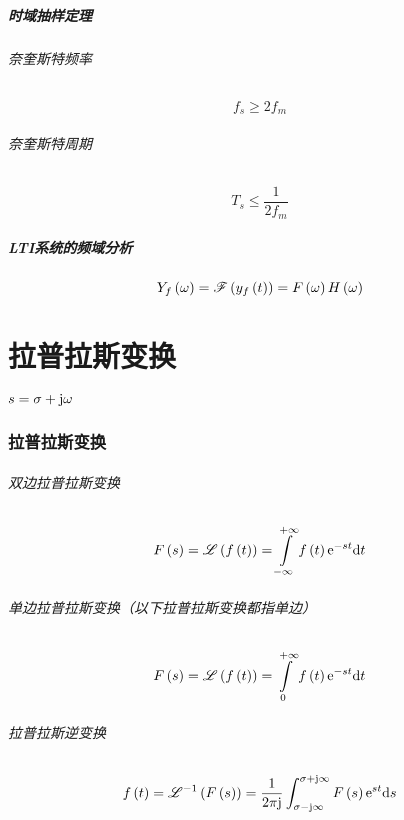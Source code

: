 \documentclass{article}
\begin{document}
\subsubsection{时域抽样定理}

\paragraph{奈奎斯特频率}

\[f_s\geqslant2f_m\]

\paragraph{奈奎斯特周期}

\[T_s\leqslant\frac1{2f_m}\]

\subsubsection{LTI系统的频域分析}

\[Y_f\left(\omega\right)=\mathscr F\left(y_f\left(t\right)\right)=F\left(\omega\right) H\left(\omega\right)\]

\part{拉普拉斯变换}

$s=\sigma+\mathrm j\omega$

\section{拉普拉斯变换}

\paragraph{双边拉普拉斯变换}

\[\fs=\laplace{\ft}=\impint\ft\e^{-st}\d t\]

\paragraph{单边拉普拉斯变换（以下拉普拉斯变换都指单边）}

\[F\left(s\right)=\mathscr L\left(f\left(t\right)\right)=\int\limits_0^{+\infty}f\left(t\right)\mathrm e^{-st}\mathrm d t\]

\paragraph{拉普拉斯逆变换}

\[f\left(t\right)=\mathscr L^{-1}\left(F\left(s\right)\right)=\frac1{2\pi\mathrm j}\int_{\sigma-\mathrm j\infty}^{\sigma+\mathrm j\infty}F\left(s\right)\mathrm e^{st}\mathrm d s\]
\end{document}
